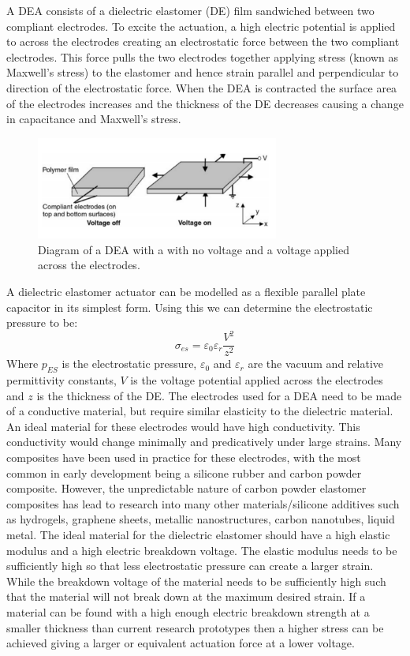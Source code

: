 A DEA consists of a dielectric elastomer (DE) film sandwiched between two compliant electrodes. To excite the actuation, a high electric potential is applied to across the electrodes creating an electrostatic force between the two compliant electrodes. This force pulls the two electrodes together applying stress (known as Maxwell's stress) to the elastomer and hence strain parallel and perpendicular to direction of the electrostatic force. When the DEA is contracted the surface area of the electrodes increases and the thickness of the DE decreases causing a change in capacitance and Maxwell's stress.
\begin{figure}[h!]
  \centering
  \includegraphics[width=8cm]{Figures/DEA_basic_diagram.png}
  \caption{Diagram of a DEA with a with no voltage and a voltage applied across the electrodes. \citep{Pelrine2000}}
  \label{fig:Artificial Muscle}
\end{figure}
A dielectric elastomer actuator can be modelled as a flexible parallel plate capacitor in its simplest form. Using this we can determine the electrostatic pressure to be:
\begin{equation}
    \sigma_{es} = \varepsilon_0 \varepsilon_r \frac{V^2}{z^2}
\end{equation}
Where $p_{ES}$ is the electrostatic pressure, $\varepsilon_0$ and $\varepsilon_r$ are the vacuum and relative permittivity constants, $V$ is the voltage potential applied across the electrodes and $z$ is the thickness of the DE. The electrodes used for a DEA need to be made of a conductive material, but require similar elasticity to the dielectric material. An ideal material for these electrodes would have high conductivity. This conductivity would change minimally and predicatively under large strains. Many composites have been used in practice for these electrodes, with the most common in early development being a silicone rubber and carbon powder composite. However, the unpredictable nature of carbon powder elastomer composites has lead to research into many other materials/silicone additives such as hydrogels, graphene sheets, metallic nanostructures, carbon nanotubes, liquid metal\citep{Liu2013,Rogers2013,Bele2018,Quinsaat2015}. The ideal material for the dielectric elastomer should have a high elastic modulus and a high electric breakdown voltage. The elastic modulus needs to be sufficiently high so that less electrostatic pressure can create a larger strain. While the breakdown voltage of the material needs to be sufficiently high such that the material will not break down at the maximum desired strain. If a material can be found with a high enough electric breakdown strength at a smaller thickness than current research prototypes then a higher stress can be achieved giving a larger or equivalent actuation force at a lower voltage.

